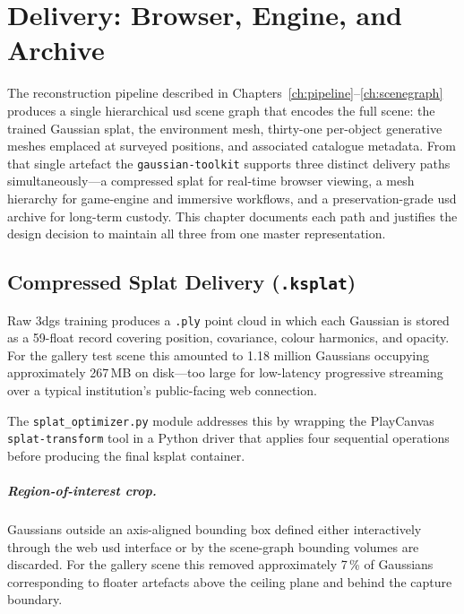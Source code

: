 
\chapter{Delivery: Browser, Engine, and Archive}
\label{ch:delivery}

The reconstruction pipeline described in Chapters~\ref{ch:pipeline}--\ref{ch:scenegraph}
produces a single hierarchical \acrshort{usd} scene graph that encodes the full scene:
the trained Gaussian splat, the environment mesh, thirty-one per-object generative
meshes emplaced at surveyed positions, and associated catalogue metadata. From that
single artefact the \texttt{gaussian-toolkit} supports three distinct delivery paths
simultaneously---a compressed splat for real-time browser viewing, a mesh hierarchy
for game-engine and immersive workflows, and a preservation-grade \acrshort{usd}
archive for long-term custody. This chapter documents each path and justifies the
design decision to maintain all three from one master representation.

\section{Compressed Splat Delivery (\texttt{.ksplat})}
\label{sec:delivery-ksplat}

Raw \acrshort{3dgs} training produces a \texttt{.ply} point cloud in which each
Gaussian is stored as a 59-float record covering position, covariance, colour
harmonics, and opacity. For the gallery test scene this amounted to 1.18 million
Gaussians occupying approximately 267\,MB on disk---too large for low-latency
progressive streaming over a typical institution's public-facing web connection.

The \texttt{splat\_optimizer.py} module addresses this by wrapping the PlayCanvas
\texttt{splat-transform} tool \parencite{SplatTransform2025} in a Python driver
that applies four sequential operations before producing the final \acrshort{ksplat}
container.

\paragraph{Region-of-interest crop.}
Gaussians outside an axis-aligned bounding box defined either interactively through
the web \acrshort{usd} interface or by the scene-graph bounding volumes are
discarded. For the gallery scene this removed approximately 7\,\% of Gaussians
corresponding to floater artefacts above the ceiling plane and behind the capture
boundary.

